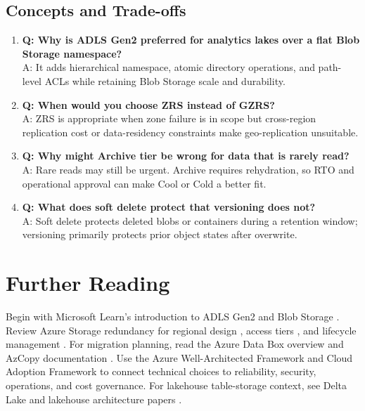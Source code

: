 \subsection{Concepts and Trade-offs}
\begin{enumerate}
    \item \textbf{Q: Why is ADLS Gen2 preferred for analytics lakes over a flat Blob Storage namespace?}\\
    A: It adds hierarchical namespace, atomic directory operations, and path-level ACLs while retaining Blob Storage scale and durability.
    \item \textbf{Q: When would you choose ZRS instead of GZRS?}\\
    A: ZRS is appropriate when zone failure is in scope but cross-region replication cost or data-residency constraints make geo-replication unsuitable.
    \item \textbf{Q: Why might Archive tier be wrong for data that is rarely read?}\\
    A: Rare reads may still be urgent. Archive requires rehydration, so RTO and operational approval can make Cool or Cold a better fit.
    \item \textbf{Q: What does soft delete protect that versioning does not?}\\
    A: Soft delete protects deleted blobs or containers during a retention window; versioning primarily protects prior object states after overwrite.
\end{enumerate}

\section{Further Reading}
Begin with Microsoft Learn's introduction to ADLS Gen2 \cite{microsoft2025adlsgen2} and Blob Storage \cite{microsoft2025blobstorage}. Review Azure Storage redundancy for regional design \cite{microsoft2025redundancy}, access tiers \cite{microsoft2025accessTiers}, and lifecycle management \cite{microsoft2025lifecycle}. For migration planning, read the Azure Data Box overview \cite{microsoft2025databox} and AzCopy documentation \cite{microsoft2025azcopy}. Use the Azure Well-Architected Framework \cite{microsoft2025wellarchitected} and Cloud Adoption Framework \cite{microsoft2025caf} to connect technical choices to reliability, security, operations, and cost governance. For lakehouse table-storage context, see Delta Lake and lakehouse architecture papers \cite{armbrust2020delta,armbrust2021lakehouse}.

